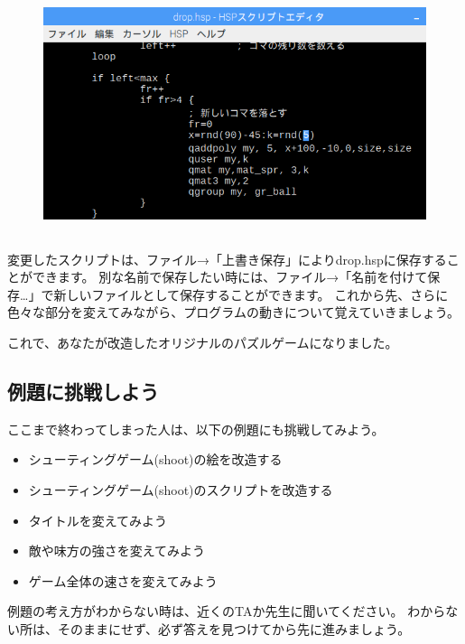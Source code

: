\begin{figure}[H]
    \begin{center}
        \includegraphics[keepaspectratio,width=12.753cm,height=7.064cm]{text02-img/text02-img041.png}
    \end{center}
\end{figure}

変更したスクリプトは、ファイル→「上書き保存」によりdrop.hspに保存することができます。
別な名前で保存したい時には、ファイル→「名前を付けて保存…」で新しいファイルとして保存することができます。
これから先、さらに色々な部分を変えてみながら、プログラムの動きについて覚えていきましょう。

これで、あなたが改造したオリジナルのパズルゲームになりました。

\subsection{例題に挑戦しよう}

ここまで終わってしまった人は、以下の例題にも挑戦してみよう。

\begin{itemize}
    \item シューティングゲーム(shoot)の絵を改造する
    \item シューティングゲーム(shoot)のスクリプトを改造する
    \item タイトルを変えてみよう
    \item 敵や味方の強さを変えてみよう
    \item ゲーム全体の速さを変えてみよう
\end{itemize}

例題の考え方がわからない時は、近くのTAか先生に聞いてください。
わからない所は、そのままにせず、必ず答えを見つけてから先に進みましょう。